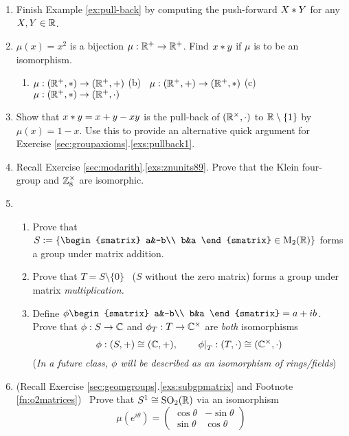 \begin{exercises}{}
\begin{enumerate}
	  
	  \item Finish Example \ref{ex:pull-back} by computing the push-forward $X\mathbin{\ast} Y$ for any $X,Y\in \mathbb{R}$.
	  
	  
		\item $\mu(x)=x^2$ is a bijection $\mu:\mathbb{R}^+\to\mathbb{R}^+$. Find $x\mathbin{\ast} y$ if $\mu$ is to be an isomorphism.
		\begin{enumerate}
		  \item $\mu:(\mathbb{R}^+,\ast)\to(\mathbb{R}^+,+)$ \qquad\quad 
		  (b) \ $\mu:(\mathbb{R}^+,+)\to(\mathbb{R}^+,\ast)$\qquad\quad 
		  (c) \ $\mu:(\mathbb{R}^+,\ast)\to(\mathbb{R}^+,\cdot)$
		\end{enumerate}
	  
	  
		\item Show that $x\mathbin{\ast} y=x+y-xy$ is the pull-back of $(\mathbb{R}^\times,\cdot)$ to $\mathbb{R}\setminus\{1\}$ by $\mu(x)=1-x$. Use this to provide an alternative quick argument for Exercise \ref*{sec:groupaxioms}.\ref{exs:pullback1}.
		
	  
	  \item Recall Exercise \ref*{sec:modarith}.\ref{exs:znunits89}. Prove that the Klein four-group and $\mathbb{Z}_8^\times$ are isomorphic.
		
		
	  \item\begin{enumerate}
	    \item Prove that $S:=\left\{
	    \begin{smatrix}
	    	a&-b\\
	    	b&a
	    \end{smatrix}
	    \in \rM_2(\R)\right\}$ forms a group under matrix addition.
	    
	    \item Prove that $T=S\setminus\{0\}$ \ ($S$ without the zero matrix) forms a group under matrix \emph{multiplication.}
	    \item Define $\phi
	    \begin{smatrix}
		    a&-b\\
		    b&a
	    \end{smatrix}
	    =a+ib$. Prove that $\phi:S\to\mathbb{C}$ and $\phi_T:T\to\mathbb{C}^\times$ are \emph{both} isomorphisms
	    \[
	    	\phi:(S,+)\cong(\mathbb{C},+),\qquad \left.\phi\right|_{T}:(T,\cdot)\cong(\mathbb{C}^\times,\cdot)
	    \]
	    (\emph{In a future class, $\phi$ will be described as an isomorphism of rings/fields})
	  \end{enumerate}
	  
	  
	  \item (Recall Exercise \ref*{sec:geomgroups}.\ref{exs:subgpmatrix} and Footnote \ref{fn:o2matrices}) \ Prove that $S^1\cong\mathrm{SO}_2(\mathbb{R})$ via an isomorphism
		\[
			\mu(e^{i\theta})=\begin{pmatrix}
				\cos\theta&-\sin\theta\\
				\sin\theta&\cos\theta
			\end{pmatrix}
		\]
		

\end{enumerate}
\end{exercises}

